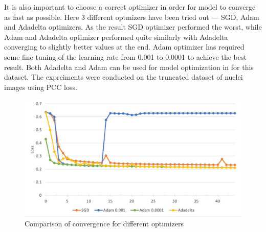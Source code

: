 It is also important to choose a correct optimizer in order for model to converge as fast as possible. Here 3 different optmizers have been tried out --- SGD, Adam and Adadelta optimizers. As the result SGD optimizer performed the worst, while Adam and Adadelta optimizer performed quite similarly with Adadelta converging to slightly better values at the end. Adam optimizer has required some fine-tuning of the learning rate from 0.001 to 0.0001 to achieve the best result. Both Adadelta and Adam can be used for model optimization in for this dataset. The expreiments were conducted on the truncated dataset of nuclei images using PCC loss.

\begin{figure}[H]
	\begin{center}
		\includegraphics[width=0.8\linewidth]{bilder/model training/optimizer-comparison.jpg}
		\caption{Comparison of convergence for different optimizers}\label{fig:optimizers}
	\end{center}
\end{figure}